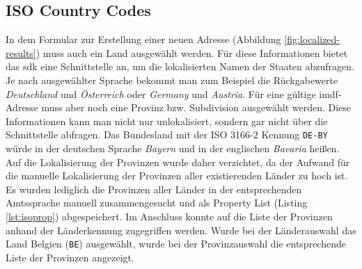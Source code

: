\subsection{ISO Country Codes}
In dem Formular zur Erstellung einer neuen Adresse (Abbildung \ref{fig:localized-results}) muss auch ein Land ausgewählt werden.
Für diese Informationen bietet das \Gls{sdk} eine Schnittstelle an, um die lokalisierten Namen der Staaten abzufragen.
Je nach ausgewählter Sprache bekommt man zum Beispiel die Rückgabewerte \emph{Deutschland} und \emph{Österreich} oder \emph{Germany} und \emph{Austria}.
Für eine gültige \ac{imdf}-Adresse muss aber noch eine Provinz bzw. Subdivision ausgewählt werden.
Diese Informationen kann man nicht nur unlokalisiert, sondern gar nicht über die Schnittstelle abfragen.
Das Bundesland mit der ISO 3166-2 Kennung \texttt{DE-BY} würde in der deutschen Sprache \emph{Bayern} und in der englischen \emph{Bavaria} heißen.
Auf die Lokalisierung der Provinzen wurde daher verzichtet, da der Aufwand für die manuelle Lokalisierung der Provinzen aller existierenden Länder zu hoch ist.
Es wurden lediglich die Provinzen aller Länder in der entsprechenden Amtssprache manuell zusammengesucht und als Property List (Listing \ref{lst:isoprop}) abgespeichert.
Im Anschluss konnte auf die Liste der Provinzen anhand der Länderkennung zugegriffen werden.
Wurde bei der Länderauswahl das Land Belgien (\texttt{BE}) ausgewählt, wurde bei der Provinzauswahl die entsprechende Liste der Provinzen angezeigt.\clearpage
{}
